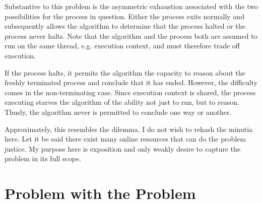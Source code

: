 \documentclass{article}
\begin{document}
	Substantive to this problem is the asymmetric exhaustion associated with the two possibilities for the process in question. Either the process exits normally and subsequently allows the algorithm to determine that the process halted or the process never halts. Note that the algorithm and the process both are assumed to run on the same thread, e.g. execution context, and must therefore trade off execution.
	
	If the process halts, it permits the algorithm the capacity to reason about the freshly terminated process and conclude that it has ended. However, the difficulty comes in the non-terminating case. Since execution context is shared, the process executing starves the algorithm of the ability not just to run, but to reason. Thusly, the algorithm never is permitted to conclude one way or another.
	
	Approximately, this resembles the dilemma. I do not wish to rehash the minutia here. Let it be said there exist many online resources that can do the problem justice. My purpose here is exposition and only weakly desire to capture the problem in its full scope.
	
	\section{Problem with the Problem}
	
\end{document}

